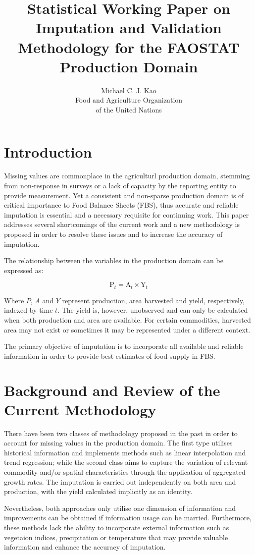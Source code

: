\documentclass[nojss]{jss}\usepackage{graphicx, color}
\title{\bf Statistical Working Paper on Imputation and Validation
  Methodology for the FAOSTAT Production Domain}
\author{Michael C. J. Kao\\ Food and Agriculture Organization \\ of
  the United Nations}
\begin{document}
\section{Introduction}
Missing values are commonplace in the agriculturl production domain,
stemming from non-response in surveys or a lack of capacity by the
reporting entity to provide measurement. Yet a consistent and
non-sparse production domain is of critical importance to Food Balance
Sheets (FBS), thus accurate and reliable imputation is essential and a
necessary requisite for continuing work. This paper addresses several
shortcomings of the current work and a new methodology is proposed in
order to resolve these issues and to increase the accuracy of
imputation.

The relationship between the variables in the production domain can be
expressed as:

\begin{equation}
  \label{eq:identity}
  \text{P}_t = \text{A}_t \times \text{Y}_t
\end{equation}


Where $P$, $A$ and $Y$ represent production, area harvested and yield,
respectively, indexed by time $t$. The yield is, however, unobserved and
can only be calculated when both production and area are
available. For certain commodities, harvested area may not exist or
sometimes it may be represented under a different context.


The primary objective of imputation is to incorporate all
available and reliable information in order to provide best estimates of
food supply in FBS.

\section{Background and Review of the Current Methodology}

There have been two classes of methodology proposed in the past in
order to account for missing values in the production domain. The
first type utilises historical information and implements methods such
as linear interpolation and trend regression; while the second class
aims to capture the variation of relevant commodity
and/or spatial characteristics through the application of
aggregated growth rates. The imputation is carried out independently
on both area and production, with the yield calculated implicitly as
an identity.

Nevertheless, both approaches only utilise one dimension of
information and improvements can be obtained if information usage
can be married. Furthermore, these methods lack the ability to
incorporate external information such as vegetaion indices,
precipitation or temperature that may provide valuable information and
enhance the accuracy of imputation.
\end{document}
